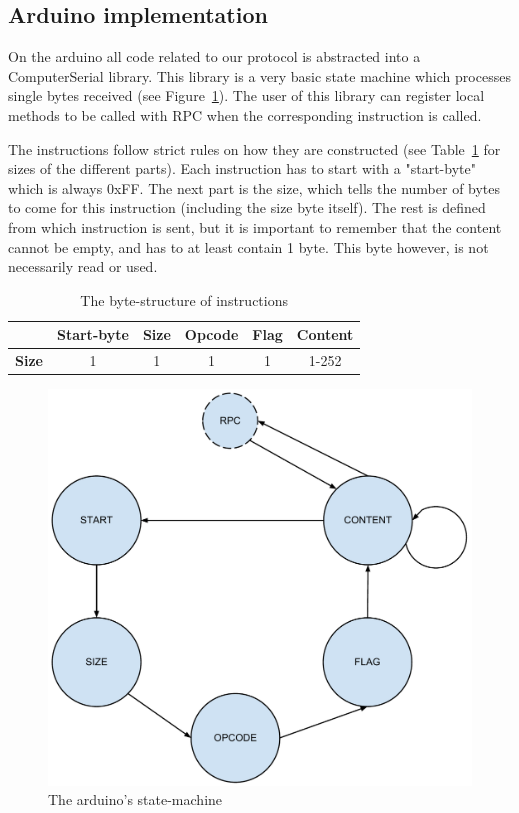 \subsection{Arduino implementation}
On the arduino all code related to our protocol is abstracted into a ComputerSerial library. This library is a very basic state machine which processes single bytes received (see Figure~\ref{fig:arduino_states}). The user of this library can register local methods to be called with RPC when the corresponding instruction is called.

The instructions follow strict rules on how they are constructed (see Table~\ref{tbl:instr_struct} for sizes of the different parts). Each instruction has to start with a "start-byte" which is always 0xFF. The next part is the size, which tells the number of bytes to come for this instruction (including the size byte itself). The rest is defined from which instruction is sent, but it is important to remember that the content cannot be empty, and has to at least contain 1 byte. This byte however, is not necessarily read or used.

\begin{table}
	\begin{tabular}{c|c|c|c|c|c|}
		\cline{2-6}
		& \textbf{Start-byte} & \textbf{Size} & \textbf{Opcode} & \textbf{Flag} & \textbf{Content} \\ \hline
		\multicolumn{1}{|c|}{\textbf{Size}} & 1 & 1 & 1 & 1 & 1-252 \\ \hline
	\end{tabular}
	\caption{The byte-structure of instructions}
	\label{tbl:instr_struct}
\end{table}

\begin{figure}
	\centering
	\includegraphics[width=\textwidth, keepaspectratio]{img/arduino_state-machine.pdf}
	\caption{The arduino's state-machine}
	\label{fig:arduino_states}
\end{figure}
